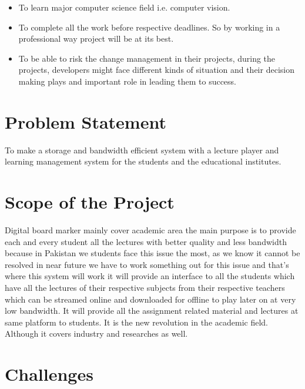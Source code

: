 \begin{itemize}

\item To learn major computer science field i.e. computer vision.


\item To complete all the work before respective deadlines. So by working in a professional way project will be at its best.

\item To be able to risk the change management in their projects, during the projects, developers might face different kinds of situation and their decision making plays and important role in leading them to success.

\end{itemize}
\bigskip

\section{Problem Statement}
To make a storage and bandwidth efficient system with a lecture player and learning management system for the students and the educational institutes.
\bigskip

\section{Scope of the Project}
Digital board marker mainly cover academic area the main purpose is to provide each and every student all the lectures with better quality and less bandwidth because in Pakistan we students face this issue the most, as we know it cannot be resolved in near future we have to work something out for this issue and that’s where this system will work it will provide an interface to all the students which have all the lectures of their respective subjects from their respective teachers which can be streamed online and downloaded for offline to play later on at very low bandwidth. It will provide all the assignment related material and lectures at same platform to students. It is the new revolution in the academic field. Although it covers industry and researches as well.
\bigskip

\section{Challenges}
\bigskip
